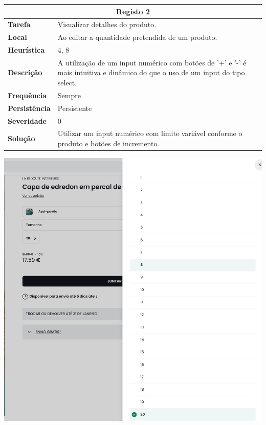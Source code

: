 \documentclass[a4paper,12pt]{article}
\begin{document}
\begin{center}
\newpage
    \begin{table}[h!]
        \centering
        \begin{tabular}{|m{3cm}|m{12cm}|}
        \hline
        \multicolumn{2}{|c|}{\textbf{Registo 2}} \\ \hline
        \textbf{Tarefa}       & Visualizar detalhes do produto. \\ \hline
        \textbf{Local}        & Ao editar a quantidade pretendida de um produto. \\ \hline
        \textbf{Heurística}   & 4, 8 \\ \hline
        \textbf{Descrição}    & A utilização de um input numérico com botões de '+' e '-' é mais intuitiva e dinâmico do que o uso de um input do tipo select. \\ \hline
        \textbf{Frequência}   & Sempre \\ \hline
        \textbf{Persistência} & Persistente \\ \hline
        \textbf{Severidade}   & 0 \\ \hline
        \textbf{Solução}      & Utilizar um input numérico com limite variável conforme o produto e botões de incremento.\\ \hline
        \end{tabular}
    \end{table}
    
    \vspace{0.5cm}
    \includegraphics[width=\textwidth, keepaspectratio]{heuristics/02input_quantidade.png}


\end{center}
\end{document}

